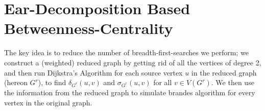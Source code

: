 \chapter{Ear-Decomposition Based Betweenness-Centrality}
\label{pachorkar}
The key idea is to reduce the number of breadth-first-searches we perform;
we construct a (weighted) reduced graph by getting rid of all the vertices of
degree 2,
and then run Dijkstra's Algorithm for each source vertex $u$ in the
reduced graph (hereon $G^r$), to find $\delta_{G^r}(u, v)$ and
$\sigma_{G^r}(u, v)$ for all $v \in V(G^r)$.
We then use the information from the reduced graph to simulate brandes
algorithm for every vertex in the original graph.





